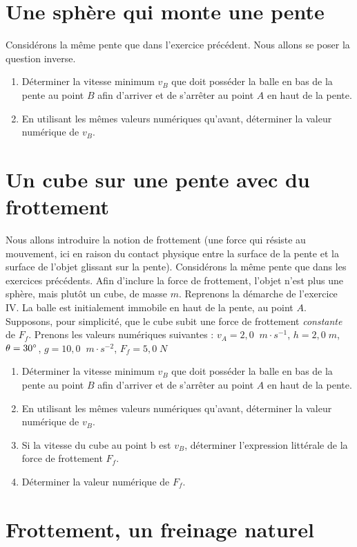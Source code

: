 \documentclass[11pt,a4paper]{article}
\newcommand{\mps}{\; m\cdot s^{-1}}
\newcommand{\mpss}{\; m\cdot s^{-2}}
\begin{document}
\section{Une sphère qui monte une pente}
Considérons la même pente que dans l'exercice précédent. Nous allons se poser la question inverse. 
\begin{enumerate}
    \item Déterminer la vitesse minimum $v_B$ que doit posséder la balle en bas de la pente au point $B$ afin d'arriver et de s'arrêter au point $A$ en haut de la pente.  
    \item En utilisant les mêmes valeurs numériques qu'avant, déterminer la valeur numérique de $v_B$.
\end{enumerate}

\section{Un cube sur une pente avec du frottement}
Nous allons introduire la notion de frottement (une force qui résiste au mouvement, ici en raison du contact physique entre la surface de la pente et la surface de l'objet glissant sur la pente).
Considérons la même pente que dans les exercices précédents. Afin d'inclure la force de frottement, l'objet n'est plus une sphère, mais plutôt un cube, de masse $m$. 
Reprenons la démarche de l'exercice IV. La balle est initialement immobile en haut de la pente, au point $A$. Supposons, pour simplicité, que le cube subit une force de frottement \textit{constante} de $F_f$. Prenons les valeurs numériques suivantes : $v_A=2,0\; \mps $, $h=2,0 \; m$, $\theta=30\degree$, $g=10,0 \; \mpss$, $F_f=5,0\; N$ 

\begin{enumerate}
    \item Déterminer la vitesse minimum $v_B$ que doit posséder la balle en bas de la pente au point $B$ afin d'arriver et de s'arrêter au point $A$ en haut de la pente.  
    \item En utilisant les mêmes valeurs numériques qu'avant, déterminer la valeur numérique de $v_B$.
    \item Si la vitesse du cube au point b est $v_B$, déterminer l'expression littérale de la force de frottement $F_f$. 
    \item Déterminer la valeur numérique de $F_f$.
\end{enumerate}

\section{Frottement, un freinage naturel}
\end{document}
